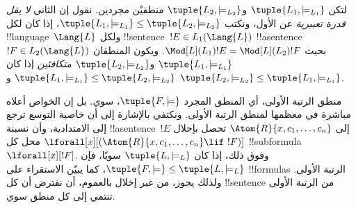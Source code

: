 \documentclass[../../../include/open-logic-section]{subfiles}
\begin{document}
\begin{defn}
لتكن $\tuple{L_1,\models_{L_1}}$ و$\tuple{L_2,\models_{L_2}}$ منطقيْن
مجردين. نقول إن الثاني \emph{لا يقل قدرة تعبيرية} عن الأول، ونكتب
$\tuple{L_1,\models_{L_1}} \leq \tuple{L_2,\models_{L_2}}$، إذا كان
لكل !!{language}~$\Lang{L}$ ولكل !!{sentence}~$!E \in L_1(\Lang{L})$
!!a{sentence}~$!F \in L_2(\Lang{L})$ بحيث
$\Mod[L](L_1){!E}=\Mod[L](L_2){!F}$. ويكون المنطقان
$\tuple{L_1,\models_{L_1}}$ و$\tuple{L_2,\models_{L_2}}$
\emph{متكافئين} إذا كان
$\tuple{L_1,\models_{L_1}} \leq \tuple{L_2,\models_{L_2}}$ و
$\tuple{L_2,\models_{L_2}} \leq \tuple{L_1,\models_{L_1}}$.
\end{defn}

\begin{rem}
  منطق الرتبة الأولى، أي المنطق المجرد $\tuple{F,\models}$، سوي. بل إن
  الخواص أعلاه مباشرة في معظمها لمنطق الرتبة الأولى. ونكتفي بالإشارة إلى
  أن خاصية التوسع ترجع إلى الامتدادية، وأن نسبنة !!a{sentence}~$!E$ إلى
  $\Atom{R}{x,c_1,\dots,c_n}$ تحصل بإحلال
  $\lforall[x][(\Atom{R}{x,c_1,\dots,c_n} \lif \ !F)]$ محل كل
  !!{subformula}~$\lforall[x][!F]$. وفوق ذلك، إذا كان
  $\tuple{L,\models_L}$ سويًا، فإن
  $\tuple{F,\models} \leq \tuple{L,\models_L}$، كما يبيّن الاستقراء على
  !!{formula}s الرتبة الأولى. ولذلك يجوز، من غير إخلال بالعموم، أن نفترض
  أن كل !!{sentence} من الرتبة الأولى تنتمي إلى كل منطق سوي.
\end{rem}
\end{document}
